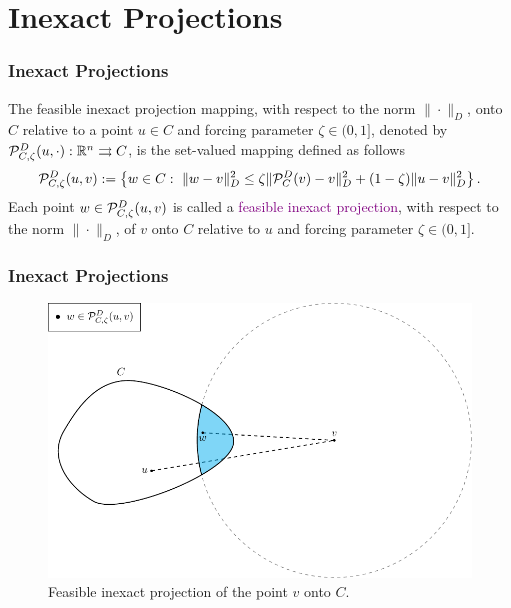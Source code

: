 \section{Inexact Projections}


\begin{frame}
  \frametitle{Inexact Projections}

  \begin{definition}
    The feasible inexact projection mapping, with respect to the norm $\| \cdot \|_{D}$,   onto $C$  relative to a point  $u \in C$ and forcing parameter $\zeta\in (0, 1]$, denoted by ${\cal P}_{C,\zeta}^{D}(u,  \cdot): {\mathbb R}^n \rightrightarrows C$,  is the set-valued mapping defined as follows
    \begin{equation*}
      {\cal P}_{C,\zeta}^{D}(u, v) := \left\{w\in C:~ \|w-v\|_{D}^2\leq \zeta \| {\cal P}_{C}^{D}(v)-v\|_{D}^2+(1-\zeta)\|u-v\|_{D}^2 \right\}.
    \end{equation*}
    Each point $w\in {\cal P}_{C,\zeta}^{D}(u, v) $ is called a  \textcolor{purple}{feasible inexact projection},  with respect to the norm $\| \cdot \|_{D}$,  of $v$ onto $C$ relative to $u$ and forcing parameter $\zeta\in (0, 1]$.
  \end{definition}
\end{frame}

\begin{frame}[t]\frametitle{Inexact Projections}\bigskip
  \begin{figure}[H]
    \centering
    \includegraphics[height=0.725\textheight]{../figures/martinezProj.pdf}
    \caption{Feasible inexact projection of the point $v$ onto $C$.}
    \label{fig:martinezProj}
  \end{figure}
\end{frame}


